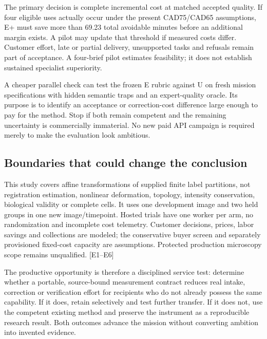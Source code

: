 \documentclass[10pt,a4paper]{article}
\begin{document}
The primary decision is complete incremental cost at matched accepted
quality. If four eligible uses actually occur under the present
CAD75/CAD65 assumptions, E+ must save more than 69.23 total avoidable
minutes before an additional margin exists. A pilot may update that
threshold if measured costs differ. Customer effort, late or partial
delivery, unsupported tasks and refusals remain part of acceptance. A
four-brief pilot estimates feasibility; it does not establish sustained
specialist superiority.

A cheaper parallel check can test the frozen E rubric against U on fresh
mission specifications with hidden semantic traps and an expert-quality
oracle. Its purpose is to identify an acceptance or correction-cost
difference large enough to pay for the method. Stop if both remain
competent and the remaining uncertainty is commercially immaterial. No
new paid API campaign is required merely to make the evaluation look
ambitious.

\hypertarget{boundaries-that-could-change-the-conclusion}{%
\subsection{Boundaries that could change the
conclusion}\label{boundaries-that-could-change-the-conclusion}}

This study covers affine transformations of supplied finite label
partitions, not registration estimation, nonlinear deformation,
topology, intensity conservation, biological validity or complete cells.
It uses one development image and two held groups in one new
image/timepoint. Hosted trials have one worker per arm, no randomization
and incomplete cost telemetry. Customer decisions, prices, labor savings
and collections are modeled; the conservative buyer screen and
separately provisioned fixed-cost capacity are assumptions. Protected
production microscopy scope remains unqualified. {[}E1--E6{]}

The productive opportunity is therefore a disciplined service test:
determine whether a portable, source-bound measurement contract reduces
real intake, correction or verification effort for recipients who do not
already possess the same capability. If it does, retain selectively and
test further transfer. If it does not, use the competent existing method
and preserve the instrument as a reproducible research result. Both
outcomes advance the mission without converting ambition into invented
evidence.

\clearpage
\end{document}
